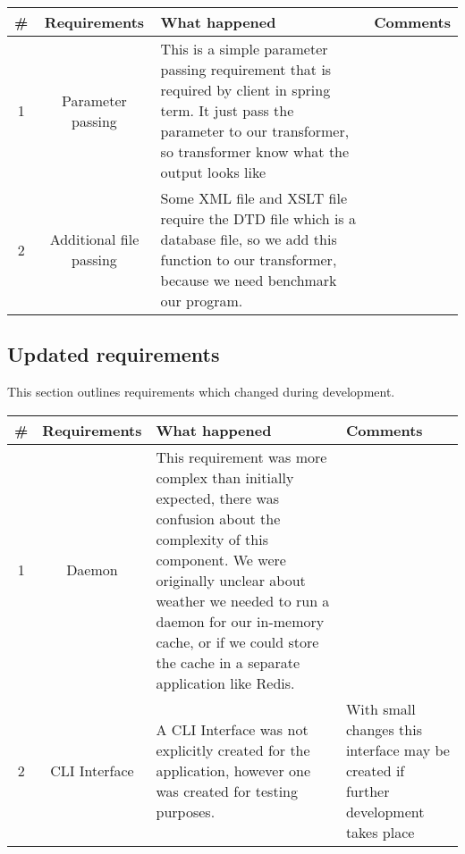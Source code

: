 \begin{center}
  \begin{tabular}{ c | c | p{7cm} | p{6cm} }
    \hline 
    \# & Requirements & What happened & Comments \\ \hline
    1 & Parameter passing & This is a simple parameter passing requirement that is required by client in spring term. It just pass the parameter to our transformer, so transformer know what the output looks like & \\ \hline
    2 & Additional file passing & Some XML file and XSLT file require the DTD file which is a database file, so we add this function to our transformer, because we need benchmark our program.& \\ \hline
  \end{tabular}
\end{center}

\subsection{Updated requirements}

This section outlines requirements which changed during development.

\begin{center}
  \begin{tabular}{ c | c | p{7cm} | p{6cm} }
    \hline
    \# & Requirements & What happened & Comments \\ \hline
    1 & Daemon & This requirement was more complex than initially expected, there was confusion about the complexity of this component. We were originally unclear about weather we needed to run a daemon for our in-memory cache, or if we could store the cache in a separate application like Redis. & \\ \hline
    2 & CLI Interface & A CLI Interface was not explicitly created for the application, however one was created for testing purposes. & With small changes this interface may be created if further development takes place \\ \hline
  \end{tabular}
\end{center}

